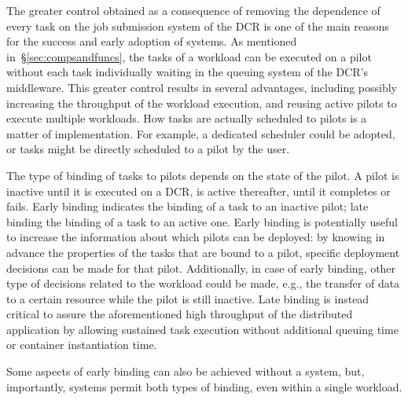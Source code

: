 \documentclass{sig-alternate}
\begin{document}

The greater control obtained as a consequence of removing the dependence of
every task on the job submission system of the DCR is one of the main reasons
for the success and early adoption of \pilot systems. As mentioned
in~\S\ref{sec:compsandfuncs}, the tasks of a workload can be executed on a pilot
without each task individually waiting in the queuing system of the DCR's
middleware. This greater control results in several advantages, including
possibly increasing the throughput of the workload execution, and reusing active pilots to execute multiple workloads. How tasks are actually scheduled to pilots is a matter of
implementation. For example, a dedicated scheduler could be adopted, or tasks
might be directly scheduled to a pilot by the user.

The type of binding of tasks to pilots depends on the state of the pilot. A
pilot is inactive until it is executed on a DCR, is active thereafter, until it
completes or fails. Early binding indicates the binding of a task to an
inactive pilot; late binding the binding of a task to an active one. Early
binding is potentially useful to increase the information about which pilots
can be deployed: by knowing in advance the properties of the tasks that are
bound to a pilot, specific deployment decisions can be made for that pilot.
Additionally, in case of early binding, other type of decisions related to the
workload could be made, e.g., the transfer of data to a certain resource while
the pilot is still inactive. Late binding is instead critical to assure the
aforementioned high throughput of the distributed application by allowing
sustained task execution without additional queuing time or container
instantiation time.

Some aspects of early binding can also be achieved without a \pilot system, but,
importantly, \pilot systems permit both types of binding, even within a single
workload.


\end{document}
